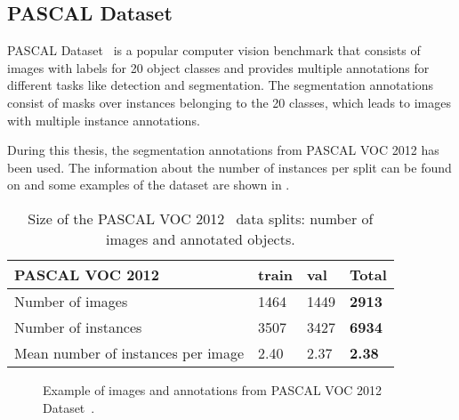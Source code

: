 \subsection{PASCAL Dataset}

PASCAL Dataset~\pascal{} is a popular computer vision benchmark that consists of images with labels for 20 object classes and provides multiple annotations for different tasks like detection and segmentation.
The segmentation annotations consist of masks over instances belonging to the 20 classes, which leads to images with multiple instance annotations.

During this thesis, the segmentation annotations from PASCAL VOC 2012 has been used.
The information about the number of instances per split can be found on  and some examples of the dataset are shown in .

\begin{table}[h]
  \centering
  \begin{tabular}{l|ll|l}
  \toprule
  PASCAL VOC 2012                    & train & val  & \textbf{Total} \\
  \midrule
  Number of images                   & 1464  & 1449 & \textbf{2913}  \\
  Number of instances                & 3507  & 3427 & \textbf{6934}  \\
  Mean number of instances per image & 2.40  & 2.37 & \textbf{2.38}  \\
  \bottomrule
  \end{tabular}
  \caption{Size of the PASCAL VOC 2012~\pascal{} data splits: number of images and annotated objects.}
  \label{tab:datasets:pascal}
\end{table}


\begin{figure}[h]
  \centering
  \caption{Example of images and annotations from PASCAL VOC 2012 Dataset~\pascal{}. }
  \label{fig:datasets:pascal}
\end{figure}


